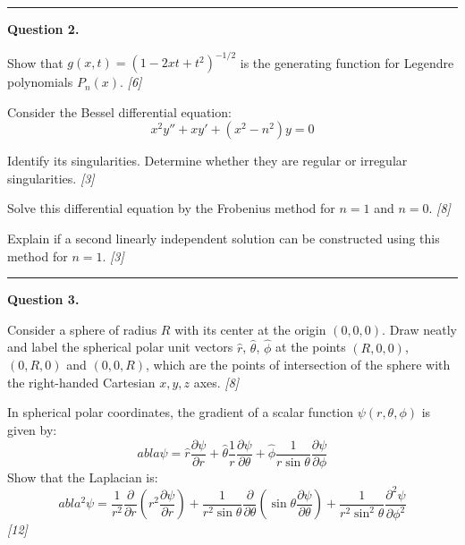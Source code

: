 \documentclass[11pt,a4paper]{article}
\newcommand{\pts}[1]{\hfill   \textit{[#1]}}
\begin{document}
\medskip\rule{\linewidth}{0.2pt}




\noindent   \textbf{Question 2.}

\begin{parts}
  \item Show that $g(x,t) = (1 - 2xt + t^2)^{-1/2}$ is the generating function for Legendre polynomials $P_n(x)$. \pts{6}
  \item Consider the Bessel differential equation:
    \[ x^2 y'' + x y' + (x^2 - n^2) y = 0 \]
    
\begin{parts}
      \item Identify its singularities. Determine whether they are regular or irregular singularities. \pts{3}
      \item Solve this differential equation by the Frobenius method for $n = 1$ and $n = 0$. \pts{8}
      \item Explain if a second linearly independent solution can be constructed using this method for $n = 1$. \pts{3}
    \end{parts}
\end{parts}

\medskip\rule{\linewidth}{0.2pt}




\noindent   \textbf{Question 3.}

\begin{parts}
  \item Consider a sphere of radius $R$ with its center at the origin $(0, 0, 0)$. Draw neatly and label the spherical polar unit vectors $\hat{r}$, $\hat{ \theta}$, $\hat{\phi}$ at the points $(R, 0, 0)$, $(0, R, 0)$ and $(0, 0, R)$, which are the points of intersection of the sphere with the right-handed Cartesian $x, y, z$ axes. \pts{8}
  \item In spherical polar coordinates, the gradient of a scalar function $\psi(r, \theta,\phi)$ is given by:
    \[ 
abla \psi = \hat{r} \frac{\partial \psi}{\partial r} + \hat{ \theta} \frac{1}{r} \frac{\partial \psi}{\partial  \theta} + \hat{\phi} \frac{1}{r\sin \theta} \frac{\partial \psi}{\partial \phi} \]
    Show that the Laplacian is:
    \[ 
abla^2 \psi = \frac{1}{r^2} \frac{\partial}{\partial r} \left( r^2 \frac{\partial \psi}{\partial r} \right) + \frac{1}{r^2\sin \theta} \frac{\partial}{\partial  \theta} \left( \sin \theta \frac{\partial \psi}{\partial  \theta} \right) + \frac{1}{r^2\sin^2 \theta} \frac{\partial^2 \psi}{\partial \phi^2} \] \pts{12}
\end{parts}
\end{document}
